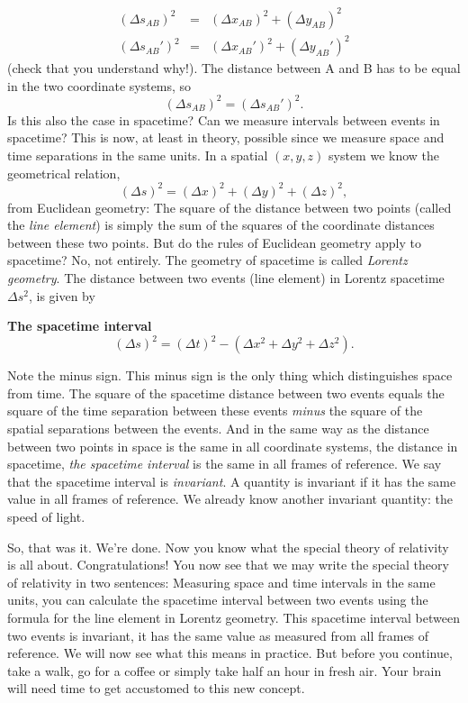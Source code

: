 {\begin{multicols}{2}
\begin{eqnarray*}
(\Delta s_{AB})^2&=&(\Delta x_{AB})^2+(\Delta y_{AB})^2\\
(\Delta s_{AB}')^2&=&(\Delta x_{AB}')^2+(\Delta y_{AB}')^2
\end{eqnarray*}
(check that you understand why!). The distance between A and B has to be equal in the two coordinate systems, so
\[
(\Delta s_{AB})^2=(\Delta s_{AB}')^2.
\]
Is this also the case in spacetime? Can we measure intervals between events in spacetime? This is now, at least in theory, possible since we measure space and time separations in the same units. In a spatial $(x,y,z)$ system we know the geometrical relation,
\[
(\Delta s)^2=(\Delta x)^2+(\Delta y)^2+(\Delta z)^2,
\]
from Euclidean geometry: The square of the distance between two points (called the {\it line element\label{pg:lineelement}}) is simply the sum of the squares of the coordinate distances between these two points. But do the rules of Euclidean geometry apply to spacetime? No, not entirely. The geometry of spacetime is called {\it Lorentz geometry\label{pg:lorentz}}. The distance between two events (line element) in Lorentz spacetime $\Delta s^2$, is given by
\begin{formbox}
\textbf{The spacetime interval}
\[
(\Delta s)^2=(\Delta t)^2-(\Delta x^2+\Delta y^2+\Delta z^2).
\]
\end{formbox}
Note the minus sign. This minus sign is the only thing which distinguishes space from time. The square of the spacetime distance between two events equals the square of the time separation between these events \emph{minus} the square of the spatial separations between the events. And in the same way as the distance between two points in space is the same in all coordinate systems, the distance in spacetime, {\it the spacetime interval\label{pg:spacetimeinterval}} is the same in all frames of reference. We say that the spacetime interval is {\it invariant\label{pg:invariant}}. A quantity is invariant if it has the same value in all frames of reference. We already know another invariant quantity: the speed of light.


So, that was it. We're done. Now you know what the special theory of relativity is all about. Congratulations! You now see that we may write the special theory of relativity in two sentences: Measuring space and time intervals in the same units, you can calculate the spacetime interval between two events using the formula for the line element in Lorentz geometry. This spacetime interval between two events is invariant, it has the same value as measured from all frames of reference. We will now see what this means in practice. But before you continue, take a walk, go for a coffee or simply take half an hour in fresh air. Your brain will need time to get accustomed to this new concept.


\end{multicols}}
